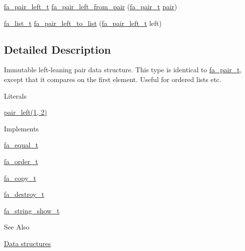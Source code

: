 \begin{DoxyCompactItemize}
\item 
\hyperlink{group___fa_pair_left_ga3d01023403cd976e31ce70c510fcf2be}{fa\-\_\-pair\-\_\-left\-\_\-t} \hyperlink{group___fa_pair_left_ga3c0242bb5eaca0d5b54ff3d1d5fe82b8}{fa\-\_\-pair\-\_\-left\-\_\-from\-\_\-pair} (\hyperlink{group___fa_pair_gac2b2e58c230bac4f8a63ef6c05072680}{fa\-\_\-pair\-\_\-t} \hyperlink{util_8h_a40ed40659d2ed7f8712b0fe6ba6edebe}{pair})
\item 
\hyperlink{group___fa_list_ga35ecb12ab934ded0cce0bcf28e3bc5d2}{fa\-\_\-list\-\_\-t} \hyperlink{group___fa_pair_left_gaa5ba7fd7171d6fbb7ddb255c605159c0}{fa\-\_\-pair\-\_\-left\-\_\-to\-\_\-list} (\hyperlink{group___fa_pair_left_ga3d01023403cd976e31ce70c510fcf2be}{fa\-\_\-pair\-\_\-left\-\_\-t} left)
\end{DoxyCompactItemize}


\subsection{Detailed Description}
Immutable left-\/leaning pair data structure. This type is identical to \hyperlink{group___fa_pair_gac2b2e58c230bac4f8a63ef6c05072680}{fa\-\_\-pair\-\_\-t}, except that it compares on the first element. Useful for ordered lists etc.

\begin{DoxyParagraph}{Literals}

\begin{DoxyItemize}
\item {\ttfamily \hyperlink{util_8h_ac4d1bd03ca6c3233c65e5ce45db38b2c}{pair\-\_\-left(1, 2)}}
\end{DoxyItemize}
\end{DoxyParagraph}
\begin{DoxyParagraph}{Implements }

\begin{DoxyItemize}
\item \hyperlink{structfa__equal__t}{fa\-\_\-equal\-\_\-t}
\item \hyperlink{structfa__order__t}{fa\-\_\-order\-\_\-t}
\item \hyperlink{structfa__copy__t}{fa\-\_\-copy\-\_\-t}
\item \hyperlink{structfa__destroy__t}{fa\-\_\-destroy\-\_\-t}
\item \hyperlink{structfa__string__show__t}{fa\-\_\-string\-\_\-show\-\_\-t}
\end{DoxyItemize}
\end{DoxyParagraph}
\begin{DoxySeeAlso}{See Also}

\begin{DoxyItemize}
\item \hyperlink{md__data_structures_DataStructures}{Data structures} 
\end{DoxyItemize}
\end{DoxySeeAlso}



